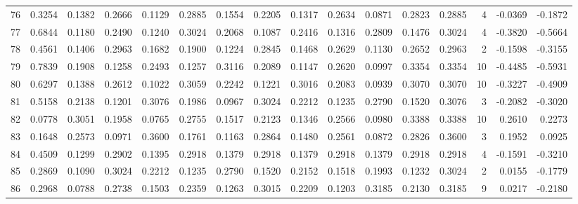 \begin{tabular}{lrrrrrrrrrrrrrrr}
76  &      0.3254 &  0.1382 &  0.2666 &  0.1129 &  0.2885 &  0.1554 &  0.2205 &  0.1317 &  0.2634 &  0.0871 &   0.2823 &     0.2885 &      4 &                   -0.0369 &                    -0.1872 \\
77  &      0.6844 &  0.1180 &  0.2490 &  0.1240 &  0.3024 &  0.2068 &  0.1087 &  0.2416 &  0.1316 &  0.2809 &   0.1476 &     0.3024 &      4 &                   -0.3820 &                    -0.5664 \\
78  &      0.4561 &  0.1406 &  0.2963 &  0.1682 &  0.1900 &  0.1224 &  0.2845 &  0.1468 &  0.2629 &  0.1130 &   0.2652 &     0.2963 &      2 &                   -0.1598 &                    -0.3155 \\
79  &      0.7839 &  0.1908 &  0.1258 &  0.2493 &  0.1257 &  0.3116 &  0.2089 &  0.1147 &  0.2620 &  0.0997 &   0.3354 &     0.3354 &     10 &                   -0.4485 &                    -0.5931 \\
80  &      0.6297 &  0.1388 &  0.2612 &  0.1022 &  0.3059 &  0.2242 &  0.1221 &  0.3016 &  0.2083 &  0.0939 &   0.3070 &     0.3070 &     10 &                   -0.3227 &                    -0.4909 \\
81  &      0.5158 &  0.2138 &  0.1201 &  0.3076 &  0.1986 &  0.0967 &  0.3024 &  0.2212 &  0.1235 &  0.2790 &   0.1520 &     0.3076 &      3 &                   -0.2082 &                    -0.3020 \\
82  &      0.0778 &  0.3051 &  0.1958 &  0.0765 &  0.2755 &  0.1517 &  0.2123 &  0.1346 &  0.2566 &  0.0980 &   0.3388 &     0.3388 &     10 &                    0.2610 &                     0.2273 \\
83  &      0.1648 &  0.2573 &  0.0971 &  0.3600 &  0.1761 &  0.1163 &  0.2864 &  0.1480 &  0.2561 &  0.0872 &   0.2826 &     0.3600 &      3 &                    0.1952 &                     0.0925 \\
84  &      0.4509 &  0.1299 &  0.2902 &  0.1395 &  0.2918 &  0.1379 &  0.2918 &  0.1379 &  0.2918 &  0.1379 &   0.2918 &     0.2918 &      4 &                   -0.1591 &                    -0.3210 \\
85  &      0.2869 &  0.1090 &  0.3024 &  0.2212 &  0.1235 &  0.2790 &  0.1520 &  0.2152 &  0.1518 &  0.1993 &   0.1232 &     0.3024 &      2 &                    0.0155 &                    -0.1779 \\
86  &      0.2968 &  0.0788 &  0.2738 &  0.1503 &  0.2359 &  0.1263 &  0.3015 &  0.2209 &  0.1203 &  0.3185 &   0.2130 &     0.3185 &      9 &                    0.0217 &                    -0.2180 \\

\end{tabular}
